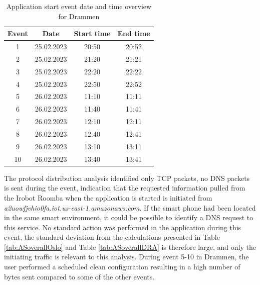 \begin{table}[H]
\centering
\caption{Application start event date and time overview for Drammen}
\label{tab:AS_dateandtimeDrammen}
\begin{tabular}{|c|c|c|c|}
\hline
\textbf{Event} & \textbf{Date} & \textbf{Start time} & \textbf{End time} \\ \hline
1              & 25.02.2023         & 20:50               & 20:52             \\ \hline
2              & 25.02.2023         & 21:20               & 21:21             \\ \hline
3              & 25.02.2023         & 22:20               & 22:22             \\ \hline
4              & 25.02.2023         & 22:50               & 22:52             \\ \hline
5              & 26.02.2023         & 11:10               & 11:11             \\ \hline
6              & 26.02.2023         & 11:40               & 11:41             \\ \hline
7              & 26.02.2023         & 12:10               & 12:11             \\ \hline
8              & 26.02.2023         & 12:40               & 12:41             \\ \hline
9              & 26.02.2023         & 13:10               & 13:11             \\ \hline
10             & 26.02.2023         & 13:40               & 13:41             \\ \hline
\end{tabular}
\end{table}

The protocol distribution analysis identified only \gls{TCP} packets, no \gls{DNS} packets is sent during the event, indication that the requested information pulled from the Irobot Roomba when the application is started is initiated from \textit{a2uowfjvhio0fa.iot.us-east-1.amazonaws.com}. If the smart phone had been located in the same smart environment, it could be possible to identify a \gls{DNS} request to this service. No standard action was performed in the application during this event, the standard deviation from the calculations presented in Table \ref{tab:ASoverallOslo} and Table \ref{tab:ASoverallDRA} is therefore large, and only the initiating traffic is relevant to this analysis. During event 5-10 in Drammen, the user performed a scheduled clean configuration resulting in a high number of bytes sent compared to some of the other events.  

